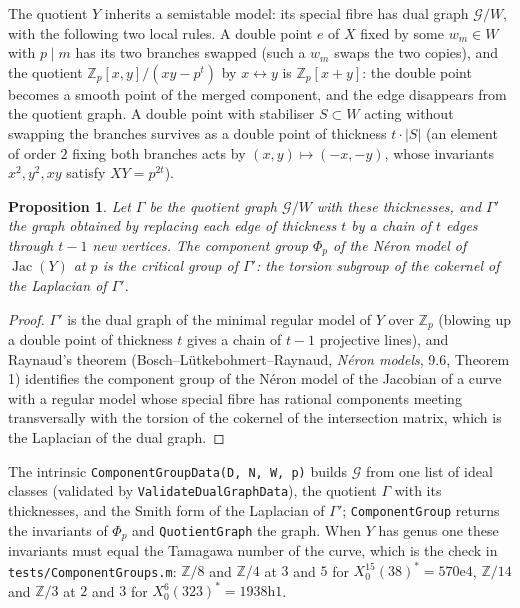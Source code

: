 \documentclass[11pt,reqno]{amsart}
\theoremstyle{plain}
\newtheorem{proposition}[theorem]{Proposition}
\theoremstyle{definition}
\DeclareMathOperator{\Jac}{Jac}
\newcommand{\Z}{\mathbb{Z}}
\begin{document}
The quotient $Y$ inherits a semistable model: its special fibre has dual graph $\mathcal G/W$, with the
following two local rules. A double point $e$ of $X$ fixed by some $w_m\in W$ with $p\mid m$ has its two
branches swapped (such a $w_m$ swaps the two copies), and the quotient $\Z_p[x,y]/(xy-p^t)$ by $x\leftrightarrow
y$ is $\Z_p[x+y]$: the double point becomes a smooth point of the merged component, and the edge disappears
from the quotient graph. A double point with stabiliser $S\subset W$ acting without swapping the branches
survives as a double point of thickness $t\cdot|S|$ (an element of order $2$ fixing both branches acts by
$(x,y)\mapsto(-x,-y)$, whose invariants $x^2,y^2,xy$ satisfy $XY=p^{2t}$).

\begin{proposition}\label{prop:phi}
Let $\Gamma$ be the quotient graph $\mathcal G/W$ with these thicknesses, and $\Gamma'$ the graph obtained by
replacing each edge of thickness $t$ by a chain of $t$ edges through $t-1$ new vertices. The component group
$\Phi_p$ of the N\'eron model of $\Jac(Y)$ at $p$ is the critical group of $\Gamma'$: the torsion subgroup of
the cokernel of the Laplacian of $\Gamma'$.
\end{proposition}

\begin{proof}
$\Gamma'$ is the dual graph of the minimal regular model of $Y$ over $\Z_p$ (blowing up a double point of
thickness $t$ gives a chain of $t-1$ projective lines), and Raynaud's theorem (Bosch--L\"utkebohmert--Raynaud,
\emph{N\'eron models}, 9.6, Theorem 1) identifies the component group of the N\'eron model of the Jacobian of a
curve with a regular model whose special fibre has rational components meeting transversally with the
torsion of the cokernel of the intersection matrix, which is the Laplacian of the dual graph.
\end{proof}

The intrinsic \texttt{ComponentGroupData(D, N, W, p)} builds $\mathcal G$ from one list of ideal classes
(validated by \texttt{ValidateDualGraphData}), the quotient $\Gamma$ with its thicknesses, and the Smith form of
the Laplacian of $\Gamma'$; \texttt{ComponentGroup} returns the invariants of $\Phi_p$ and
\texttt{QuotientGraph} the graph. When $Y$ has genus one these invariants must equal the Tamagawa number of the
curve, which is the check in \texttt{tests/ComponentGroups.m}: $\Z/8$ and $\Z/4$ at $3$ and $5$ for
$X_0^{15}(38)^*=570\mathrm{e}4$, $\Z/14$ and $\Z/3$ at $2$ and $3$ for $X_0^6(323)^*=1938\mathrm{h}1$.
\end{document}
